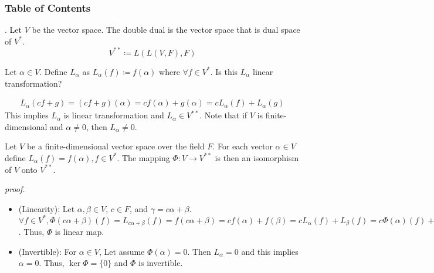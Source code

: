 \documentclass[8pt]{beamer}
\newcommand{\ti}[1]{\textit{#1}}
\begin{document}
\begingroup
    \begin{frame}
        \frametitle{Table of Contents}
        \tableofcontents[currentsubsection]
    \end{frame}
\endgroup

\begin{frame}{.}
    Let $V$ be the vector space.
    The double dual is the vector space that is dual space of $V^\ast$.
    \[
    V^{\ast \ast} \coloneq L(L(V, F), F)
    \]

    Let $\alpha \in V$.
    Define $L_{\alpha}$ as $L_{\alpha}(f) \coloneq f(\alpha)$ where $\forall f \in V^\ast$.
    Is this $L_{\alpha}$ linear transformation?

    \[
        \begin{aligned}
            L_{\alpha} (cf + g) = (cf+g)(\alpha) = cf(\alpha) + g(\alpha) = c L_{\alpha}(f) + L_{\alpha}(g)
        \end{aligned}
    \]
    This implies $L_{\alpha}$ is linear transformation and $L_{\alpha} \in V^{\ast\ast}$.
    Note that if $V$ is finite-dimensional and $\alpha \neq 0$, then $L_{\alpha} \neq 0$.

    \begin{theorem} \label{th:7}
        Let $V$ be a finite-dimensional vector space over the field $F$.
        For each vector $\alpha \in V$ define $L_{\alpha} (f) =f(\alpha), f \in V^\ast$.
        The mapping $\Phi : V \to V^{\ast\ast}$ is then an isomorphism of $V$ onto $V^{\ast\ast}$.
    \end{theorem}
    \ti{proof.}

    \begin{itemize}
        \item (Linearity):
        Let $\alpha, \beta \in V$, $c \in F$, and $\gamma = c\alpha + \beta$.
        $\forall f \in V^\ast, \Phi(c \alpha + \beta)(f) = L_{c \alpha + \beta}(f) = f(c \alpha + \beta) = cf(\alpha) + f(\beta) = c L_{\alpha}(f) + L_{\beta}(f) = c\Phi(\alpha)(f) + \Phi(\beta)(f)$.
        Thus, $\Phi$ is linear map.
        \item (Invertible): For $\alpha \in V$, Let assume $\Phi(\alpha) = 0$.
        Then $L_{\alpha} = 0$ and this implies $\alpha = 0$.
        Thus, $\ker \Phi =\{0\}$ and $\Phi$ is invertible.
    \end{itemize}
\end{frame}
\end{document}
